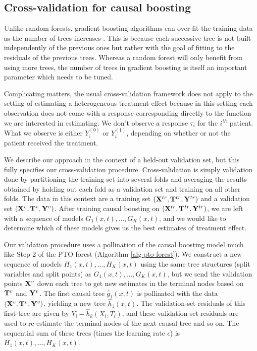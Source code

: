 \documentclass{article}
\begin{document}
\subsection{Cross-validation for causal boosting}
\label{sub-cv}

Unlike random forests, gradient boosting algorithms can over-fit the training
data as the number of trees increases \citep{ESL}. This is because each
successive tree is
not built independently of the previous ones but rather with the goal of
fitting to the residuals of the previous trees. Whereas a random forest will
only benefit from using more trees, the number of trees in gradient boosting is
itself an important parameter which needs to be tuned.

Complicating matters, the usual cross-validation framework does not apply to
the setting of estimating a heterogeneous treatment effect because in this
setting each observation does not come with a response corresponding directly
to the function we are interested in estimating. We don't observe a response
$\tau_i$ for the $i^{th}$ patient. What we observe is either $Y_i^{(0)}$ or
$Y_i^{(1)}$, depending on whether or not the patient received the treatment.

We describe our approach in the context of a held-out validation set, but this
fully specifies our cross-validation procedure. Cross-validation is
simply validation done by partitioning the training set into several folds and
averaging the results obtained by holding out each fold as a validation set and
training on all other folds. The data in this context are a training set
$(\mathbf{X}^{tr}, \mathbf{T}^{tr}, \mathbf{Y}^{tr})$ and a validation set
$(\mathbf{X}^{v}, \mathbf{T}^{v}, \mathbf{Y}^{v})$. After training causal boosting on
$(\mathbf{X}^{tr}, \mathbf{T}^{tr}, \mathbf{Y}^{tr})$, we are left with a sequence of models
$G_1(x, t), ..., G_K(x, t)$, and we would like to determine which of these
models gives us the best estimates of treatment effect.

Our validation procedure uses a pollination of the causal boosting model much
like Step 2 of the PTO forest (Algorithm \ref{alg-pto-forest}). We construct a
new sequence of models $H_1(x, t), ..., H_K(x, t)$ using the same tree
structures (split variables and split points) as $G_1(x, t), ..., G_K(x, t)$,
but we send the validation points $\mathbf{X}^v$ down each tree to get new estimates
in the terminal nodes based on $\mathbf{T}^v$ and $\mathbf{Y}^v$. The first causal tree
$\hat g_1(x, t)$ is pollinated with the data $(\mathbf{X}^v, \mathbf{T}^v, \mathbf{Y}^v)$, yielding
a new tree $\hat h_1(x, t)$. The validation-set residuals of this first tree
are given by $Y_i - \hat h_k(X_i, T_i)$, and these validation-set residuals are
used to re-estimate the terminal nodes of the next causal tree and so on. The
sequential sum of these trees (times the learning rate $\epsilon$) is
$H_1(x, t), ..., H_K(x, t)$.
\end{document}
